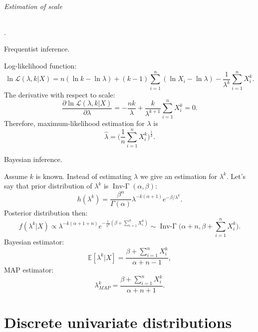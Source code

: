 \documentclass[a4paper,11pt]{article}
\theoremstyle{plain}
\theoremstyle{definition}
\begin{document}
\paragraph{Estimation of scale}.
\subparagraph{Frequentist inference.} Log-likelihood function:
\[
\ln \mathcal{L}(\lambda, k|X) = n (\ln k - \ln \lambda) + (k-1)\sum_{i=1}^{n}(\ln X_i - \ln \lambda) - \frac{1}{\lambda^k}\sum_{i=1}^{n} X_i^k.
\]
The derivative with respect to scale:
\[
\frac{\partial\ln \mathcal{L}(\lambda, k|X) }{\partial \lambda} = -\frac{n k}{\lambda} + \frac{k}{\lambda^{k+1}} \sum_{i=1}^{n} X_i^k=0.
\]
Therefore, maximum-likelihood estimation for $\lambda$ is
\[
\hat{\lambda} = \bigg(\frac{1}{n}\sum_{i=1}^{n}X_i^k\bigg)^{\frac{1}{k}}.
\]
\subparagraph{Bayesian inference.} Assume $k$ is known. Instead of estimating $\lambda$ we give an estimation for $\lambda^k$. Let's say that prior distribution of $\lambda^k$ is $\operatorname{Inv-\Gamma}(\alpha, \beta)$:
\[
h(\lambda^k) = \frac{\beta^\alpha}{\Gamma(\alpha)} \lambda^{-k(\alpha+1)} e^{-\beta / \lambda^k}.
\]
Posterior distribution then:
\[
f(\lambda^k| X) \propto \lambda^{-k(\alpha+1+n)} e^{-\frac{1}{\lambda^k} (\beta+\sum_{i=1}^{n}X_i^k)} \sim \operatorname{Inv-\Gamma}\bigg(\alpha+n, \beta+\sum_{i=1}^{n}X_i^k\bigg).
\]
Bayesian estimator:
\[
\mathbb{E}[\lambda^k|X] = \frac{\beta+\sum_{i=1}^{n}X_i^k}{\alpha+n-1},
\]
MAP estimator:
\[
\lambda_{MAP}^k = \frac{\beta+\sum_{i=1}^{n}X_i^k}{\alpha+n+1}.
\]

	\pagebreak
	\part{Discrete univariate distributions}
\end{document}
